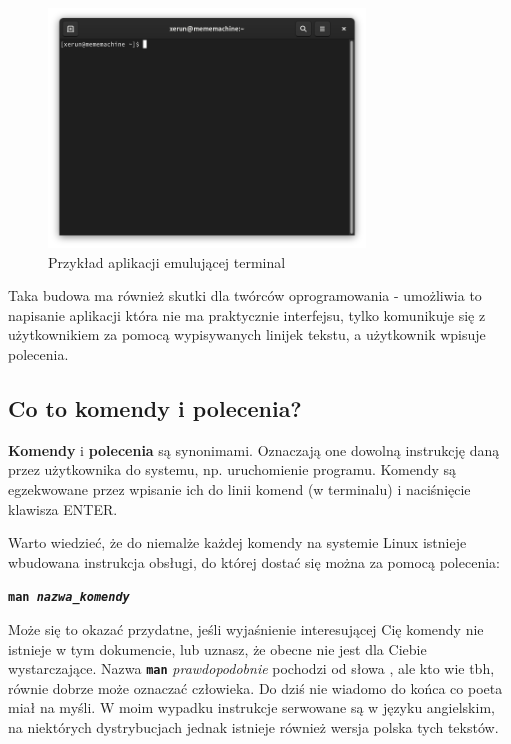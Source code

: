\documentclass[12pt]{article}
\newcommand{\ttbf}[1]{
    \texttt{\textbf{#1}}
}
\begin{document}
\begin{figure}[H]
    \centering
    \includegraphics[width=0.75\textwidth]{przyklad terminal.png}
    \caption{Przykład aplikacji emulującej terminal}
\end{figure}

Taka budowa ma również skutki dla twórców oprogramowania - umożliwia to napisanie aplikacji która nie ma praktycznie interfejsu, tylko komunikuje się z użytkownikiem za pomocą wypisywanych linijek tekstu, a użytkownik wpisuje polecenia. 

\subsection{Co to komendy i polecenia?}

\textbf{Komendy} i \textbf{polecenia} są synonimami. Oznaczają one dowolną instrukcję daną przez użytkownika do systemu, np. uruchomienie programu. Komendy są egzekwowane przez wpisanie ich do linii komend (w terminalu) i naciśnięcie klawisza ENTER.

Warto wiedzieć, że do niemalże każdej komendy na systemie Linux istnieje wbudowana instrukcja obsługi, do której dostać się można za pomocą polecenia:

\ttbf{man \emph{nazwa\_komendy}}

Może się to okazać przydatne, jeśli wyjaśnienie interesującej Cię komendy nie istnieje w tym dokumencie, lub uznasz, że obecne nie jest dla Ciebie wystarczające. Nazwa \ttbf{man} \emph{prawdopodobnie} pochodzi od słowa , ale kto wie tbh, równie dobrze może oznaczać człowieka. Do dziś nie wiadomo do końca co poeta miał na myśli. W moim wypadku instrukcje serwowane są w języku angielskim, na niektórych dystrybucjach jednak istnieje również wersja polska tych tekstów.
\end{document}
